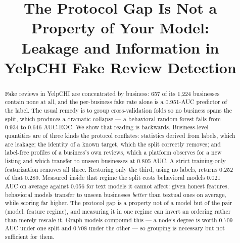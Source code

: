 \documentclass[conference]{IEEEtran}
\begin{document}
\title{The Protocol Gap Is Not a Property of Your Model:\\
Leakage and Information in YelpCHI Fake Review Detection}

\author{
\and
{}
}

\maketitle


\begin{abstract}
Fake reviews in YelpCHI are concentrated by business: 657 of its 1{,}224
businesses contain none at all, and the per-business fake rate alone is a
0.951-AUC predictor of the label. The usual remedy is to group cross-validation
folds so no business spans the split, which produces a dramatic collapse --- a
behavioral random forest falls from 0.934 to 0.646 AUC-ROC. We show that reading
is backwards. Business-level quantities are of three kinds the protocol
conflates: statistics derived from labels, which are leakage; the identity of a
known target, which the split correctly removes; and label-free profiles of a
business's own reviews, which a platform observes for a new listing and which
transfer to unseen businesses at 0.805 AUC. A strict training-only
featurization removes all three. Restoring only the third, using no labels,
returns 0.252 of that 0.289. Measured inside that regime the split costs
behavioral models 0.021 AUC on average against 0.056 for text models it cannot
affect: given honest features, behavioral models transfer to unseen businesses
\emph{better} than textual ones on average, while scoring far higher. The
protocol gap is a property not of a model but of the pair (model, feature
regime), and measuring it in one regime can invert an ordering rather than
merely rescale it. Graph models compound this --- a node's degree is worth 0.709
AUC under one split and 0.708 under the other --- so grouping is necessary but
not sufficient for them.
\end{abstract}
\end{document}

